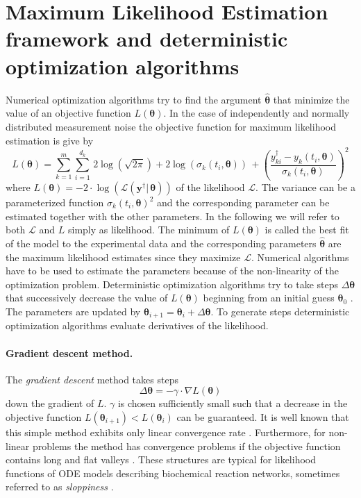 \documentclass[12pt,a4paper]{scrartcl}
\begin{document}
\section{Maximum Likelihood Estimation framework and deterministic optimization algorithms} 
\label{sec:det_optimization}
Numerical optimization algorithms try to find the argument $\boldsymbol{\hat \theta}$ that minimize the 
value of an objective function $L(\boldsymbol{\theta})$. In the case of independently and normally 
distributed measurement noise the objective function for maximum likelihood estimation is give by
\begin{equation}
	L(\boldsymbol{\theta}) = \sum_{k=1}^m \sum_{i=1}^{d_k}\, 2\log(\sqrt{2 \pi}) + 2\log(\sigma_k(t_i, 
\boldsymbol{\theta}))\, + \left(\frac{y_{ki}^\dagger - y_{k}(t_{i}, \boldsymbol{\theta})}{\sigma_k(t_i, 
\boldsymbol{\theta})}\right)^2 \label{llhoodfun2}
\end{equation}
where $L(\boldsymbol{\theta}) =  - 2\cdot \log(\mathcal{L}(\mathbf{y}^\dagger|\,\boldsymbol{\theta}))$ of the 
likelihood $\mathcal{L}$. The variance can be a parameterized function $\sigma_k(t_i, 
\boldsymbol{\theta})^2$ and the corresponding parameter can be estimated together with the other 
parameters. In the following we will refer to both $\mathcal{L}$ and $L$ simply as likelihood. The minimum 
of $L(\boldsymbol{\theta})$ is called the best fit of the model to the experimental data and the corresponding 
parameters $\boldsymbol{\hat \theta}$ are the maximum likelihood estimates since they maximize $
\mathcal{L}$. Numerical algorithms have to be used to estimate the parameters because of the non-linearity 
of the optimization problem. Deterministic optimization algorithms try to take steps $\Delta 
\boldsymbol{\theta}$ that successively decrease the value of $L(\boldsymbol{\theta})$ beginning from an 
initial guess $\boldsymbol{\theta}_0$ \citep{Press:1990rw}. The parameters are updated by $
\boldsymbol{\theta}_{i+1} = \boldsymbol{\theta}_{i} + \Delta \boldsymbol{\theta}$. To generate steps 
deterministic optimization algorithms evaluate derivatives of the likelihood. 

\paragraph{Gradient descent method.}
The \emph{gradient descent} method takes steps 
\begin{equation}
	\Delta \boldsymbol{\theta} = - \gamma \cdot \nabla L(\boldsymbol{\theta}) \label{gradientstep}
\end{equation}	
down the gradient of $L$. $\gamma$ is chosen sufficiently small such that a decrease in the objective 
function $L(\boldsymbol{\theta}_{i+1}) < L(\boldsymbol{\theta}_{i})$ can be guaranteed. It is well known that 
this simple method exhibits only linear convergence rate \citep{Stoer:2005fk}. Furthermore, for non-linear 
problems the method has convergence problems if the objective function contains long and flat valleys 
\citep{Rosenbrock:1960fk}. These structures are typical for likelihood functions of ODE models describing 
biochemical reaction networks, sometimes referred to as \emph{sloppiness} \citep{Gutenkunst:2007ct}. 
\end{document}
